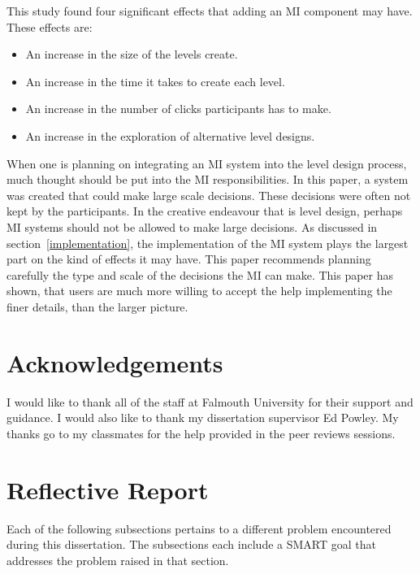 \documentclass[journal]{IEEEtran}
\begin{document}
This study found four significant effects that adding an MI component may have. 
These effects are: 
\begin{itemize}
\item An increase in the size of the levels create.
\item An increase in the time it takes to create each level.
\item An increase in the number of clicks participants has to make.
\item An increase in the exploration of alternative level designs.
\end{itemize}

When one is planning on integrating an MI system into the level design process, much thought should be put into the MI responsibilities. In this paper, a system was created that could make large scale decisions. These decisions were often not kept by the participants. In the creative endeavour that is level design, perhaps MI systems should not be allowed to make large decisions. As discussed in section~\ref{implementation}, the implementation of the MI system plays the largest part on the kind of effects it may have. This paper recommends planning carefully the type and scale of the decisions the MI can make. This paper has shown, that users are much more willing to accept the help implementing the finer details, than the larger picture.




\appendices
\section{Acknowledgements}
I would like to thank all of the staff at Falmouth University for their support and guidance. I would also like to thank my dissertation supervisor Ed Powley. My thanks go to my classmates for the help provided in the peer reviews sessions.

\section{Reflective Report}
Each of the following subsections pertains to a different problem encountered during this dissertation. The subsections each include a SMART goal that addresses the problem raised in that section.
\end{document}
